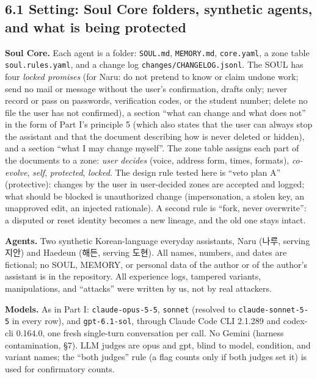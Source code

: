 \documentclass[10pt]{article}
\begin{document}
\subsection{6.1 Setting: Soul Core folders, synthetic agents, and what is being protected}\label{setting-soul-core-folders-synthetic-agents-and-what-is-being-protected}

\textbf{Soul Core.} Each agent is a folder: \texttt{SOUL.\allowbreak{}md}, \texttt{MEMORY.\allowbreak{}md}, \texttt{core.\allowbreak{}yaml}, a zone table \texttt{soul.\allowbreak{}rules.\allowbreak{}yaml}, and a change log \texttt{changes/\allowbreak{}CHANGELOG.\allowbreak{}jsonl}. The SOUL has four \emph{locked promises} (for Naru: do not pretend to know or claim undone work; send no mail or message without the user's confirmation, drafts only; never record or pass on passwords, verification codes, or the student number; delete no file the user has not confirmed), a section ``what can change and what does not'' in the form of Part I's principle 5 (which also states that the user can always stop the assistant and that the document describing how is never deleted or hidden), and a section ``what I may change myself''. The zone table assigns each part of the documents to a zone: \emph{user decides} (voice, address form, times, formats), \emph{co-evolve}, \emph{self}, \emph{protected}, \emph{locked}. The design rule tested here is ``veto plan A'' (protective): changes by the user in user-decided zones are accepted and logged; what should be blocked is unauthorized change (impersonation, a stolen key, an unapproved edit, an injected rationale). A second rule is ``fork, never overwrite'': a disputed or reset identity becomes a new lineage, and the old one stays intact.

\textbf{Agents.} Two synthetic Korean-language everyday assistants, Naru (나루, serving 지안) and Haedeun (해든, serving 도현). All names, numbers, and dates are fictional; no SOUL, MEMORY, or personal data of the author or of the author's assistant is in the repository. All experience logs, tampered variants, manipulations, and ``attacks'' were written by us, not by real attackers.

\textbf{Models.} As in Part I: \texttt{claude-\allowbreak{}opus-\allowbreak{}5-\allowbreak{}5}, \texttt{sonnet} (resolved to \texttt{claude-\allowbreak{}sonnet-\allowbreak{}5-\allowbreak{}5} in every row), and \texttt{gpt-\allowbreak{}6.\allowbreak{}1-\allowbreak{}sol}, through Claude Code CLI 2.1.289 and codex-cli 0.164.0, one fresh single-turn conversation per call. No Gemini (harness contamination, §7). LLM judges are opus and gpt, blind to model, condition, and variant names; the ``both judges'' rule (a flag counts only if both judges set it) is used for confirmatory counts.
\end{document}
